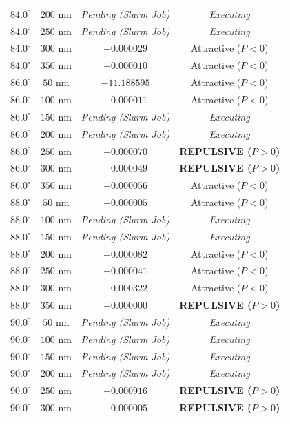 \begin{table}[h!]
\begin{tabular}{cccc}
$84.0^\circ$ & $200$ nm & \textit{Pending (Slurm Job)} & \textit{Executing} \\
$84.0^\circ$ & $250$ nm & \textit{Pending (Slurm Job)} & \textit{Executing} \\
$84.0^\circ$ & $300$ nm & $-0.000029$ & Attractive ($P<0$) \\
$84.0^\circ$ & $350$ nm & $-0.000010$ & Attractive ($P<0$) \\
$86.0^\circ$ & $50$ nm & $-11.188595$ & Attractive ($P<0$) \\
$86.0^\circ$ & $100$ nm & $-0.000011$ & Attractive ($P<0$) \\
$86.0^\circ$ & $150$ nm & \textit{Pending (Slurm Job)} & \textit{Executing} \\
$86.0^\circ$ & $200$ nm & \textit{Pending (Slurm Job)} & \textit{Executing} \\
$86.0^\circ$ & $250$ nm & $+0.000070$ & \textbf{REPULSIVE ($P>0$)} \\
$86.0^\circ$ & $300$ nm & $+0.000049$ & \textbf{REPULSIVE ($P>0$)} \\
$86.0^\circ$ & $350$ nm & $-0.000056$ & Attractive ($P<0$) \\
$88.0^\circ$ & $50$ nm & $-0.000005$ & Attractive ($P<0$) \\
$88.0^\circ$ & $100$ nm & \textit{Pending (Slurm Job)} & \textit{Executing} \\
$88.0^\circ$ & $150$ nm & \textit{Pending (Slurm Job)} & \textit{Executing} \\
$88.0^\circ$ & $200$ nm & $-0.000082$ & Attractive ($P<0$) \\
$88.0^\circ$ & $250$ nm & $-0.000041$ & Attractive ($P<0$) \\
$88.0^\circ$ & $300$ nm & $-0.000322$ & Attractive ($P<0$) \\
$88.0^\circ$ & $350$ nm & $+0.000000$ & \textbf{REPULSIVE ($P>0$)} \\
$90.0^\circ$ & $50$ nm & \textit{Pending (Slurm Job)} & \textit{Executing} \\
$90.0^\circ$ & $100$ nm & \textit{Pending (Slurm Job)} & \textit{Executing} \\
$90.0^\circ$ & $150$ nm & \textit{Pending (Slurm Job)} & \textit{Executing} \\
$90.0^\circ$ & $200$ nm & \textit{Pending (Slurm Job)} & \textit{Executing} \\
$90.0^\circ$ & $250$ nm & $+0.000916$ & \textbf{REPULSIVE ($P>0$)} \\
$90.0^\circ$ & $300$ nm & $+0.000005$ & \textbf{REPULSIVE ($P>0$)} \\

\end{tabular}
\end{table}
